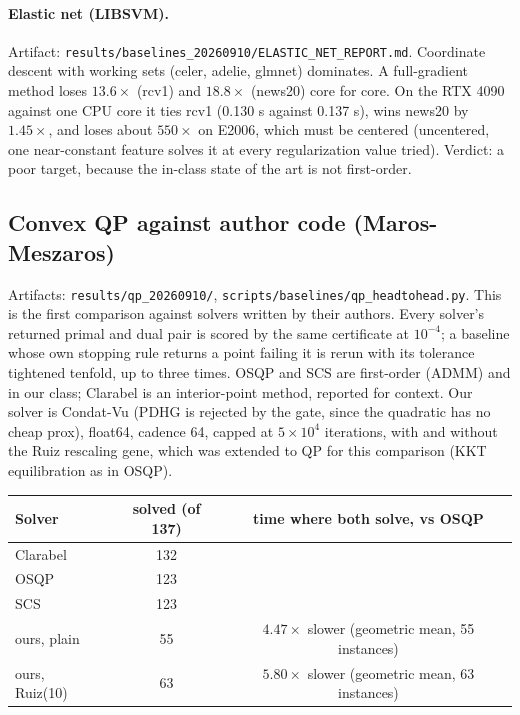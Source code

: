 \paragraph{Elastic net (LIBSVM).}
Artifact: \texttt{results/baselines\_20260910/ELASTIC\_NET\_REPORT.md}.
Coordinate descent with working sets (celer, adelie, glmnet) dominates. A
full-gradient method loses $13.6\times$ (rcv1) and $18.8\times$ (news20) core
for core. On the RTX 4090 against one CPU core it ties rcv1 (0.130 s against
0.137 s), wins news20 by $1.45\times$, and loses about $550\times$ on E2006,
which must be centered (uncentered, one near-constant feature solves it at
every regularization value tried). Verdict: a poor target, because the
in-class state of the art is not first-order.

\subsection{Convex QP against author code (Maros-Meszaros)}
\label{app:log:qp}

Artifacts: \texttt{results/qp\_20260910/},
\texttt{scripts/baselines/qp\_headtohead.py}. This is the first comparison
against solvers written by their authors. Every solver's returned primal and
dual pair is scored by the same certificate at $10^{-4}$; a baseline whose
own stopping rule returns a point failing it is rerun with its tolerance
tightened tenfold, up to three times. OSQP and SCS are first-order (ADMM) and
in our class; Clarabel is an interior-point method, reported for context.
Our solver is Condat-Vu (PDHG is rejected by the gate, since the quadratic
has no cheap prox), float64, cadence 64, capped at $5\times10^4$ iterations,
with and without the Ruiz rescaling gene, which was extended to QP for this
comparison (KKT equilibration as in OSQP).

\begin{center}
\small
\begin{tabular}{lcc}
\toprule
Solver & solved (of 137) & time where both solve, vs OSQP \\
\midrule
Clarabel & 132 & \\
OSQP & 123 & \\
SCS & 123 & \\
ours, plain & 55 & $4.47\times$ slower (geometric mean, 55 instances) \\
ours, Ruiz(10) & 63 & $5.80\times$ slower (geometric mean, 63 instances) \\
\bottomrule
\end{tabular}
\end{center}

